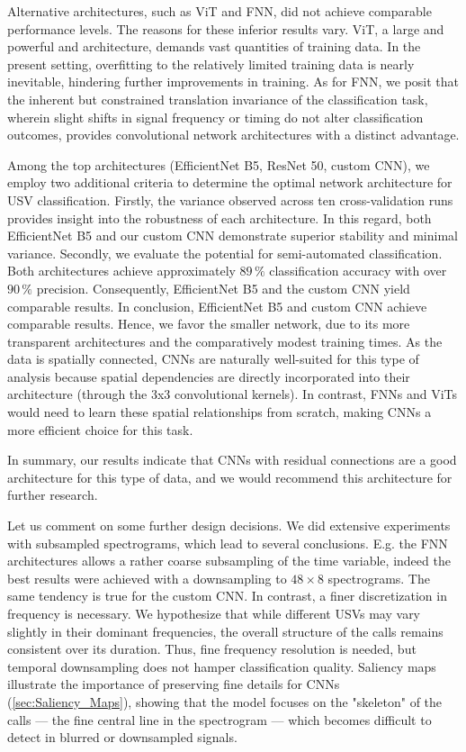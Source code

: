 \documentclass[preprint,NumberedRefs]{JASA}
\begin{document}
Alternative architectures, such as ViT and FNN, did not achieve comparable performance levels. The reasons for these inferior results vary. ViT, a large and powerful and architecture, demands vast quantities of training data. In the present setting, overfitting to the relatively limited training data is nearly inevitable, hindering further improvements in training. As for FNN, we posit that the inherent but constrained translation invariance of the classification task, wherein slight shifts in signal frequency or timing do not alter classification outcomes, provides convolutional network architectures with a distinct advantage.

Among the top architectures (EfficientNet B5, ResNet 50, custom CNN), we employ two additional criteria to determine the optimal network architecture for USV classification. Firstly, the variance observed across ten cross-validation runs provides insight into the robustness of each architecture. In this regard, both EfficientNet B5 and our custom CNN demonstrate superior stability and minimal variance. Secondly, we evaluate the potential for semi-automated classification. Both architectures achieve approximately \(89\,\mathrm{\%} \) classification accuracy with over \(90\,\mathrm{\%} \) precision. Consequently, EfficientNet B5 and the custom CNN yield comparable results. In conclusion, EfficientNet B5 and custom CNN achieve comparable results. Hence, we favor the smaller network, due to its more transparent architectures and the comparatively modest training times. As the data is spatially connected, CNNs are naturally well-suited for this type of analysis because spatial dependencies are directly incorporated into their architecture (through the 3x3 convolutional kernels). In contrast, FNNs and ViTs would need to learn these spatial relationships from scratch, making CNNs a more efficient choice for this task.

In summary, our results indicate that CNNs with residual connections are a good architecture for this type of data, and we would recommend this architecture for further research.

Let us comment on some further design decisions.
We did extensive experiments with subsampled spectrograms, which lead to several conclusions. E.g. the FNN architectures allows a rather coarse subsampling of the time variable, indeed the best results were achieved with a downsampling to $48 \times8$ spectrograms. The same tendency is true for the custom CNN. In contrast, a finer discretization in frequency is necessary. We hypothesize that while different USVs may vary slightly in their dominant frequencies, the overall structure of the calls remains consistent over its duration. Thus, fine frequency resolution is needed, but temporal downsampling does not hamper classification quality. Saliency maps illustrate the importance of preserving fine details for CNNs (\autoref{sec:Saliency_Maps}), showing that the model focuses on the "skeleton" of the calls — the fine central line in the spectrogram — which becomes difficult to detect in blurred or downsampled signals.
\end{document}
